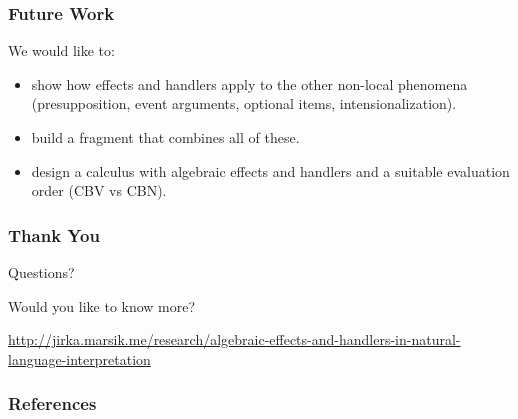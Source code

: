 \documentclass{beamer}
\begin{document}
\begin{frame} \frametitle{Future Work}

\vfill
We would like to:
\vfill
\begin{itemize}
\item show how effects and handlers apply to the other non-local phenomena
  (presupposition, event arguments, optional items, intensionalization).
  \vfill
\item build a fragment that combines all of these.
  \vfill
\item design a calculus with algebraic effects and handlers and a suitable
  evaluation order (CBV vs CBN).
\end{itemize}
\vfill
  
\end{frame}

\begin{frame}
  \frametitle{Thank You}
  \vfill
  \begin{center}
    Questions?
  \end{center}
  \vfill
  \begin{center}
    Would you like to know more?

    \vspace{6mm}

    \scriptsize{\url{http://jirka.marsik.me/research/algebraic-effects-and-handlers-in-natural-language-interpretation}}
  \end{center}
\end{frame}

\begin{frame}
  \frametitle{References}
  \footnotesize{\printbibliography}
\end{frame}
\end{document}
